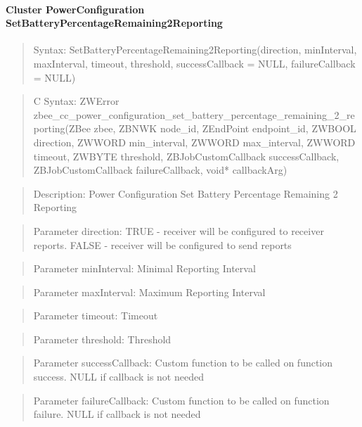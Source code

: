 \paragraph{Cluster PowerConfiguration SetBatteryPercentageRemaining2Reporting}
\begin{quote}Syntax: SetBatteryPercentageRemaining2Reporting(direction, minInterval, maxInterval, timeout, threshold, successCallback = NULL, failureCallback = NULL)\end{quote}
\begin{quote}C Syntax: ZWError zbee\_cc\_power\_configuration\_set\_battery\_percentage\_remaining\_2\_reporting(ZBee zbee, ZBNWK node\_id, ZEndPoint endpoint\_id, ZWBOOL direction, ZWWORD min\_interval, ZWWORD max\_interval, ZWWORD timeout, ZWBYTE threshold, ZBJobCustomCallback successCallback, ZBJobCustomCallback failureCallback, void* callbackArg)\end{quote}
\begin{quote}Description: Power Configuration Set Battery Percentage Remaining 2 Reporting\end{quote}
\begin{quote}Parameter direction: TRUE  - receiver will be configured to receiver reports. FALSE - receiver will be configured to send reports\end{quote}
\begin{quote}Parameter minInterval: Minimal Reporting Interval\end{quote}
\begin{quote}Parameter maxInterval: Maximum Reporting Interval\end{quote}
\begin{quote}Parameter timeout: Timeout\end{quote}
\begin{quote}Parameter threshold: Threshold\end{quote}
\begin{quote}Parameter successCallback: Custom function to be called on function success. NULL if callback is not needed\end{quote}
\begin{quote}Parameter failureCallback: Custom function to be called on function failure. NULL if callback is not needed\end{quote}


